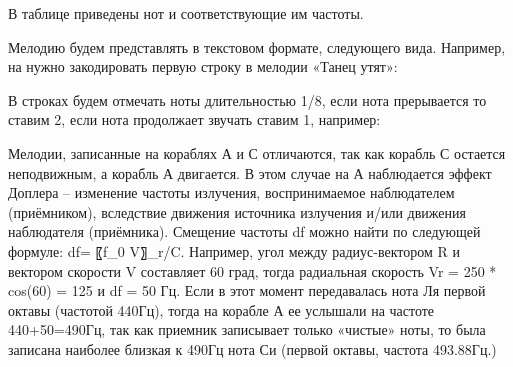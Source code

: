 В таблице приведены нот и соответствующие им частоты.


\explaneSection

Мелодию будем представлять в текстовом формате, следующего вида. Например, на нужно закодировать первую строку в мелодии «Танец утят»:

В строках будем отмечать ноты длительностью 1/8, если нота прерывается то ставим 2, если нота продолжает звучать ставим 1, например:


Мелодии, записанные на кораблях А и С отличаются, так как корабль С остается неподвижным, а корабль А двигается. В этом случае на А наблюдается эффект Доплера – изменение частоты излучения, воспринимаемое наблюдателем (приёмником), вследствие движения источника излучения и/или движения наблюдателя (приёмника). Смещение частоты df можно найти по следующей формуле:
df=  〖f_0 V〗_r/C.
Например, угол между радиус-вектором R и вектором скорости V составляет 60 град, тогда радиальная скорость Vr = 250 * cos(60) = 125 и df = 50 Гц. Если в этот момент передавалась нота Ля первой октавы (частотой 440Гц), тогда на корабле А ее услышали на частоте 440+50=490Гц, так как приемник записывает только «чистые» ноты, то была записана наиболее близкая к 490Гц нота Си (первой октавы, частота 493.88Гц.)
